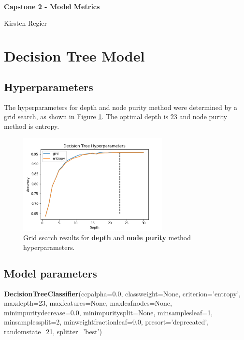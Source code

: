 \documentclass[11pt, letterpaper]{article}
\begin{document}
\begin{center}
\Large{\textbf{Capstone 2 - Model Metrics}}

\large{Kirsten Regier}
\end{center}

\section{Decision Tree Model}
\subsection{Hyperparameters}
The hyperparameters for depth and node purity method were determined by a grid search, as shown in Figure \ref{fig:DTHyper}. The optimal depth is 23 and node purity method is entropy.

\begin{figure}[h]
\begin{center}
\includegraphics[width=3in]{DTHyperparameters.png}
\caption{Grid search results for \textbf{depth} and \textbf{node purity} method hyperparameters.} 
\label{fig:DTHyper}
\end{center}
\end{figure}

\subsection{Model parameters}
\noindent \textbf{DecisionTreeClassifier}(ccp\textunderscore alpha=0.0, class\textunderscore weight=None, criterion='entropy', max\textunderscore depth=23, \newline max\textunderscore features=None, max\textunderscore leaf\textunderscore nodes=None, min\textunderscore impurity\textunderscore decrease=0.0, min\textunderscore impurity\textunderscore split=None, min\textunderscore samples\textunderscore leaf=1, min\textunderscore samples\textunderscore split=2, min\textunderscore weight\textunderscore fraction\textunderscore leaf=0.0, presort='deprecated', random\textunderscore state=21, splitter='best')
\end{document}

